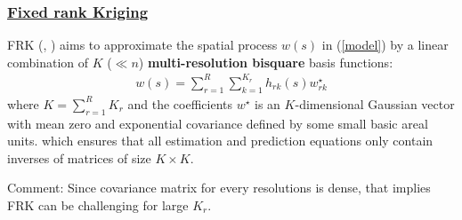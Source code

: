 \documentclass[
12pt, %
a4paper, %
oneside, %
headinclude,footinclude, %
BCOR5mm, %
]{scrartcl}
\begin{document}
\subsubsection{\href{https://chenyw68.github.io/Literature/[2017]An R Package for Spatial and Spatio-Temporal Prediction with Large Datasets(FRK).pdf}{Fixed rank Kriging}}
FRK (\href{https://chenyw68.github.io/Literature/[2006]Spatial prediction for massive datasets.pdf}{\citep{cressie2006spatial}}, \href{https://chenyw68.github.io/Literature/[2008]Fixed rank kriging for very large spatial data sets.pdf}{\citep{cressie2008fixed}}) aims to approximate the spatial process $w(s)$ in (\ref{model}) by a linear combination of $K$ ($\ll n$) \textbf{multi-resolution bisquare} basis functions: \begin{equation}
\begin{aligned}
w(s) = \sum_{r = 1}^{R}\sum_{k = 1}^{K_r}h_{rk}(s)w_{rk}^{\star}
\end{aligned} \label{FRK}
\end{equation}
where $K = \sum_{r = 1}^{R}K_r$ and the coefficients $w^{\star}$ is an $K$-dimensional Gaussian vector with mean zero and exponential covariance  defined by some small basic areal units.
which ensures that all estimation and prediction equations only contain inverses of matrices of size $K \times K$.

\textcolor[rgb]{1.00,0.00,1.00}{Comment:}
Since covariance matrix for every resolutions is dense, that implies FRK can be challenging for large $K_r$.
\end{document}

